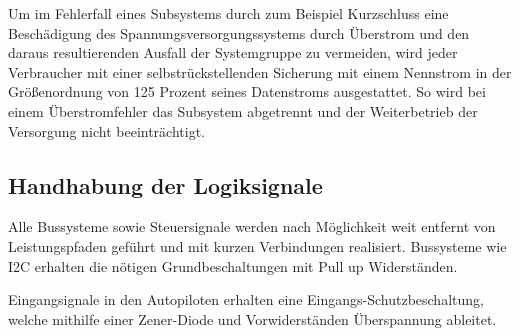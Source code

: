 Um im Fehlerfall eines Subsystems durch zum Beispiel Kurzschluss eine Beschädigung des Spannungsversorgungssystems durch Überstrom und den daraus resultierenden Ausfall der Systemgruppe zu vermeiden, wird jeder Verbraucher mit einer selbstrückstellenden Sicherung mit einem Nennstrom in der Größenordnung von 125 Prozent seines Datenstroms ausgestattet.
So wird bei einem Überstromfehler das Subsystem abgetrennt und der Weiterbetrieb der Versorgung nicht beeinträchtigt.

\begin{comment}
Die Erzeugung der erforderlichen Versorgungsspannungen für alle Subsysteme erfolgt über den Einbau von Gleichstrom-Gleichstrom Wechselrichtern (kurz DC-DC Wandlern).
Diese erzeugen die nötigen Spannungen durch sogenannte "Step down"  Wandlung aus der Spannung des Batteriesystems.
Für empfindliche Systeme wie den Autopiloten und die Sensoren werden die jeweiligen Spannungen durch die Verwendung von Linearreglern erzeugt, welche eine hohe Genauigkeit, geringe Varianz und niedrige Restwelligkeit des erzielten Ausgangsspannungswertes gewährleisten.

Um im Fehlerfall eines Subsystems durch zum Beispiel Kurzschluss eine Beschädigung des Spannungsversorgungssystems durch Überstrom und den daraus resultierenden Ausfall der Systemgruppe zu vermeiden, wird jeder Verbraucher mit einer selbstrückstellenden Sicherung mit einem Nennstrom in der Größenordnung von 125 Prozent seines Datenstroms ausgestattet.
So wird bei einem Überstromfehler das Subsystem abgetrennt und der Weiterbetrieb der Versorgung nicht beeinträchtigt.
\end{comment}

\subsection{Handhabung der Logiksignale}

Alle Bussysteme sowie Steuersignale werden nach Möglichkeit weit entfernt von Leistungspfaden geführt und mit kurzen Verbindungen realisiert.
Bussysteme wie I2C erhalten die nötigen Grundbeschaltungen mit Pull up Widerständen.

Eingangsignale in den Autopiloten erhalten eine Eingangs-Schutzbeschaltung, welche mithilfe einer Zener-Diode und Vorwiderständen Überspannung ableitet.

\begin{comment}
Alle Bussysteme sowie Steuersignale werden nach Möglichkeit weit entfernt von Leistungspfaden geführt und mit kurzen Verbindungen realisiert.
Bussysteme wie I2C erhalten die nötigen Grundbeschaltungen mit Pull up Widerständen.

Eingangsignale in den Autopiloten erhalten eine Eingangs-Schutzbeschaltung, welche mithilfe einer Zener-Diode und Vorwiderständen Überspannung ableitet.
\end{comment}